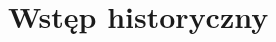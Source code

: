\documentclass{beamer}  %
\begin{document}
\section{Wstęp historyczny}















\end{document}
